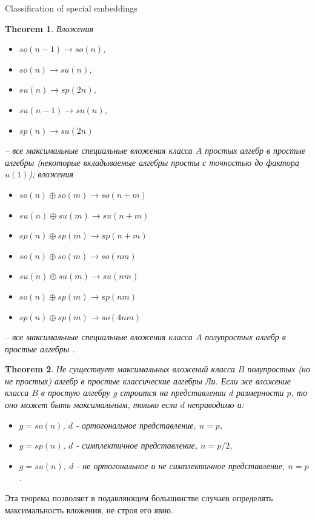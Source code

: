 \documentclass{article}
\newtheorem{theorem}{Theorem}
\begin{document}
Classification of special embeddings

\begin{theorem}\label{va1}
Вложения
\begin{itemize}
\item $so(n-1)\rightarrow so(n)$,
\item $so(n)\rightarrow su(n)$,
\item $su(n)\rightarrow sp(2n)$,
\item $su(n-1)\rightarrow su(n)$,
\item $sp(n)\rightarrow su(2n)$
\end{itemize} -- все максимальные специальные вложения класса $A$ простых алгебр в простые алгебры (некоторые вкладываемые алгебры просты с точностью до фактора $u(1)$);
вложения
\begin{itemize}
\item $so(n)\oplus so(m)\rightarrow so(n+m)$
\item $su(n)\oplus su(m)\rightarrow su(n+m)$
\item $sp(n)\oplus sp(m)\rightarrow sp(n+m)$
\item $so(n)\oplus so(m)\rightarrow so(nm)$
\item $su(n)\oplus su(m)\rightarrow su(nm)$
\item $so(n)\oplus sp(m)\rightarrow sp(nm)$
\item $sp(n)\oplus sp(m)\rightarrow so(4nm)$
\end{itemize} -- все максимальные специальные вложения класса $A$ полупростых алгебр в простые алгебры \cite {sp1}.
\end{theorem}


\begin{theorem}\label{va2}
Не существует максимальных вложений класса $B$ полупростых (но не простых) алгебр в простые классические алгебры Ли. Если же вложение класса $B$ в простую алгебру $g$ строится на представлении $d$ размерности $p$, то оно может быть максимальным, только если $d$ неприводимо и:
\begin{itemize}
\item $g=so(n)$, $d$ -  ортогональное представление, $n=p$,
\item $g=sp(n)$, $d$ -  симплектичное представление, $n=p/2$,
\item $g=su(n)$, $d$ -  не ортогональное и не симплектичное представление, $n=p$.
\cite {sp1}
\end{itemize}
\end{theorem}

Эта теорема позволяет в подавляющем большинстве случаев определять максимальность вложения, не строя его явно.\\
\end{document}
